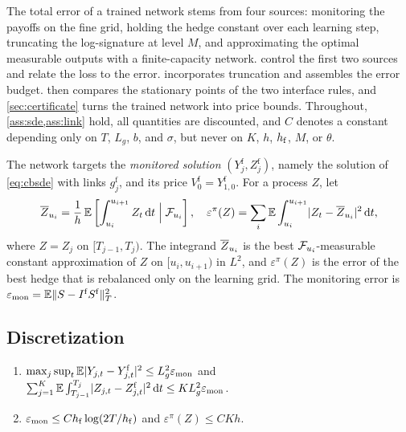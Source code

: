 \label{sec:analysis}

The total error of a trained network stems from four sources: monitoring the payoffs on the fine grid, holding the hedge constant over each learning step, truncating the log-signature at level $M$, and approximating the optimal measurable outputs with a finite-capacity network.  control the first two sources and relate the loss to the error.  incorporates truncation and assembles the error budget.  then compares the stationary points of the two interface rules, and \cref{sec:certificate} turns the trained network into price bounds. Throughout, \cref{ass:sde,ass:link} hold, all quantities are discounted, and $C$ denotes a constant depending only on $T$, $L_g$, $b$, and $\sigma$, but never on $K$, $h$, $h_{\mathrm f}$, $M$, or $\theta$.

The network targets the \emph{monitored solution} $(Y^{\mathrm f}_j,Z^{\mathrm f}_j)$, namely the solution of \eqref{eq:cbsde} with links $g^{\mathrm f}_j$, and its price $V^{\mathrm f}_0=Y^{\mathrm f}_{1,0}$. For a process $Z$, let
\[
\overline Z_{u_i}=\frac1h\,\mathbb{E}\left[\int_{u_i}^{u_{i+1}}Z_t\,\mathrm{d} t\Bigm|\mathcal{F}_{u_i}\right],\quad
\varepsilon^\pi(Z)=\sum_{i}\mathbb{E}\int_{u_i}^{u_{i+1}}\lvert Z_t-\overline Z_{u_i}\rvert^2\,\mathrm{d} t,
\]
where $Z=Z_j$ on $[T_{j-1},T_j)$. The integrand $\overline Z_{u_i}$ is the best $\mathcal{F}_{u_i}$-measurable constant approximation of $Z$ on $[u_i,u_{i+1})$ in $L^2$, and $\varepsilon^\pi(Z)$ is the error of the best hedge that is rebalanced only on the learning grid. The monitoring error is $\varepsilon_{\mathrm{mon}}=\mathbb{E}\lVert S-I^{\mathrm f} S^{\mathrm f}\rVert_T^2$.

\subsection{Discretization}\label{sec:disc}

\begin{theorem}[discretization]\label{thm:discretisation}
\leavevmode
\begin{enumerate}[label=(\alph*)]
\item $\max_j\sup_{t}\mathbb{E}\lvert Y_{j,t}-Y^{\mathrm f}_{j,t}\rvert^2\le L_g^2\varepsilon_{\mathrm{mon}}$ and $\sum_{j=1}^K\mathbb{E}\int_{T_{j-1}}^{T_j}\lvert Z_{j,t}-Z^{\mathrm f}_{j,t}\rvert^2\,\mathrm{d} t\le KL_g^2\varepsilon_{\mathrm{mon}}$.
\item $\varepsilon_{\mathrm{mon}}\le Ch_{\mathrm f}\log(2T/h_{\mathrm f})$ and $\varepsilon^\pi(Z)\le CKh$.
\end{enumerate}
\end{theorem}

